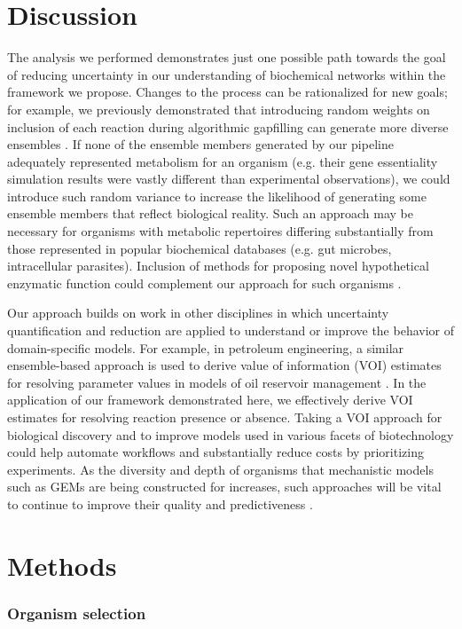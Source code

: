 \documentclass[11pt,twocolumn,notitlepage,openany,twoside]{book}
\begin{document}
\begin{refsection}
\section{Discussion}

The analysis we performed demonstrates just one possible path towards the goal of reducing uncertainty in our understanding of biochemical networks within the framework we propose. Changes to the process can be rationalized for new goals; for example, we previously demonstrated that introducing random weights on inclusion of each reaction during algorithmic gapfilling can generate more diverse ensembles \cite{Biggs2017-md}. If none of the ensemble members generated by our pipeline adequately represented metabolism for an organism (e.g. their gene essentiality simulation results were vastly different than experimental observations), we could introduce such random variance to increase the likelihood of generating some ensemble members that reflect biological reality. Such an approach may be necessary for organisms with metabolic repertoires differing substantially from those represented in popular biochemical databases (e.g. gut microbes, intracellular parasites). Inclusion of methods for proposing novel hypothetical enzymatic function could complement our approach for such organisms \cite{Hatzimanikatis2005-wy,Jeffryes2015-bm}.

Our approach builds on work in other disciplines in which uncertainty quantification and reduction are applied to understand or improve the behavior of domain-specific models. For example, in petroleum engineering, a similar ensemble-based approach is used to derive value of information (VOI) estimates for resolving parameter values in models of oil reservoir management \cite{He2018-nb}. In the application of our framework demonstrated here, we effectively derive VOI estimates for resolving reaction presence or absence. Taking a VOI approach for biological discovery and to improve models used in various facets of biotechnology could help automate workflows and substantially reduce costs by prioritizing experiments. As the diversity and depth of organisms that mechanistic models such as GEMs are being constructed for increases, such approaches will be vital to continue to improve their quality and predictiveness \cite{Magnusdottir2017-dk,Monk2014-fa}.

\section{Methods}
\subsubsection{Organism selection}


\end{refsection}
\end{document}
